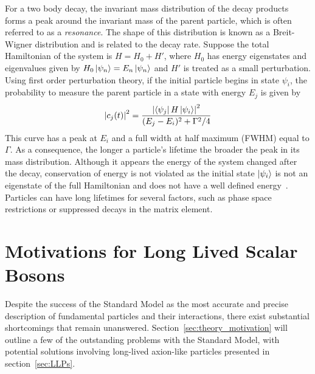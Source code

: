 For a two body decay, the invariant mass distribution of the decay products forms a peak around the invariant mass of the parent particle, which is often referred to as a \textit{resonance}. The shape of this distribution is known as a Breit-Wigner distribution and is related to the decay rate. Suppose the total Hamiltonian of the system is $H=H_0+H'$, where $H_0$ has energy eigenstates and eigenvalues given by $H_0\ket{\psi_n}=E_n\ket{\psi_n}$ and $H'$ is treated as a small perturbation. Using first order perturbation theory, if the initial particle begins in state $\psi_i$, the probability to measure the parent particle in a state with energy $E_j$ is given by
\begin{equation}
	\left|c_j(t)\right|^2=\frac{\left|\bra{\psi_j}H\ket{\psi_i}\right|^2}{(E_j-E_i)^2+\Gamma^2/4}
\end{equation}
This curve has a peak at $E_i$ and a full width at half maximum (FWHM) equal to $\Gamma$. As a consequence, the longer a particle's lifetime the broader the peak in its mass distribution. Although it appears the energy of the system changed after the decay, conservation of energy is not violated as the initial state $\ket{\psi_i}$ is not an eigenstate of the full Hamiltonian and does not have a well defined energy~\cite{breitwigner}. Particles can have long lifetimes for several factors, such as phase space restrictions or suppressed decays in the matrix element.

\section{Motivations for Long Lived Scalar Bosons} \label{sec:BSM}
Despite the success of the Standard Model as the most accurate and precise description of fundamental particles and their interactions, there exist substantial shortcomings that remain unanswered. Section~\ref{sec:theory_motivation} will outline a few of the outstanding problems with the Standard Model, with potential solutions involving long-lived axion-like particles presented in section~\ref{sec:LLPs}.


